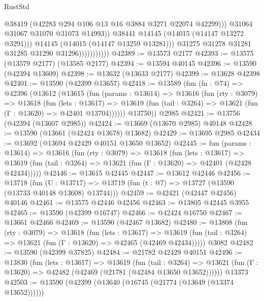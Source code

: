 \begin{lexlean}{RustStd}
\begin{coremodule}
                                      @38419
                                      (@42283 @294 @106 @13 @16 @3884 @3271 @22074 @42299)))
                                  @31064
                                  @31067
                                  @31070
                                  @31073
                                  @14993))
                              @38441
                              @14145
                              (@14015 (@14147 @13272 @3291)))
                            @14145
                            (@14015 (@14147 @13259 @13281)))
                          @31275
                          @31278
                          @31281
                          @31285
                          @31290
                          @31296)))))))))))
@42389 := @13573 @2177
@42393 := @13575 (@13579 @2177) (@13585 @2177)
@42394 := @13594 @40145
@42396 := @13590 (@42394 @13609)
@42398 := @13632 (@13633 @2177)
@42399 := @13628 @42398
@42401 := @13590 (@42399 @13657)
@42418 := @13589
    (fun (fn : @74) =>
    @42396
      (@13612
        (@13615
          (fun (params : @13614) =>
          @13616
            (fun (rty : @3079) =>
            @13618
              (fun (lets : @13617) =>
              @13619 (fun (tail : @3264) => @13621 (fun (Γ : @13620) => @42401 @13704))))))
        @13750))
    @2985
@42421 := @13756 (@42394 (@13607 @2985))
@42424 := @13669 (@13670 @2985) @40148
@42428 := @13590 (@13661 (@42424 @13678) @13682)
@42429 := @13695 @2985
@42434 := @13692 (@13694 @42429 @40151 @13650 @13652)
@42445 := fun (params : @13614) =>
  @13616
    (fun (rty : @3079) =>
    @13618
      (fun (lets : @13617) =>
      @13619 (fun (tail : @3264) => @13621 (fun (Γ : @13620) => @42401 (@42428 @42434)))))
@42446 := @13615 @42445
@42447 := @13612 @42446
@42456 := @13718
    (fun (U : @13717) => @13719 (fun (t : @7) => @13727 (@13590 (@13733 @40148 @13608) @13744)))
@42459 := @42421 (@42447 @42456) @40146
@42461 := @13575 @42446 @42456
@42463 := @13805 @42445 @3955
@42465 := @13590 (@42399 @16747)
@42466 := @42424 @16750
@42467 := @13661 @42466
@42469 := @13590 (@42467 @13682)
@42480 := @13808
    (fun (rty : @3079) =>
    @13618
      (fun (lets : @13617) =>
      @13619 (fun (tail : @3264) => @13621 (fun (Γ : @13620) => @42465 (@42469 @42434)))))
    @3082
@42482 := @13590 (@42399 @37825)
@42484 := @21782 @42429 @40151
@42496 := @13830
    (fun (lets : @13617) =>
    @13619
      (fun (tail : @3264) =>
      @13621 (fun (Γ : @13620) => @42482 (@42469 (@21781 (@42484 @13650 @13652))))))
    @13373
@42503 := @13590 (@42399 (@13640 (@16745 (@21774 (@13649 (@13374 @13652))))))

\end{coremodule}
\end{lexlean}

